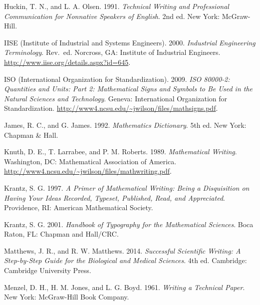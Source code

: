 \documentclass{wscpaperproc}
\theoremstyle{wsc}
\begin{document}
\begin{hangref}
\item
Huckin, T. N., and L. A. Olsen.  1991.  {\it Technical Writing and
Professional Communication for Nonnative Speakers of English}.  2nd ed. New
York: McGraw-Hill.


\item
IISE (Institute of Industrial and Systems Engineers).  2000. {\it
Industrial Engineering Terminology}.  Rev.\ ed.  Norcross, GA: Institute of
Industrial Engineers.
\href{http://www.iise.org/details.aspx?id=645}%
{\url{http://www.iise.org/details.aspx?id=645}}\textcolor{black}{.}


\item
ISO (International Organization for Standardization).  2009.  \textit{ISO
80000-2: Quantities and Units: Part 2: Mathematical Signs and Symbols to
Be Used in the Natural Sciences and Technology}.  Geneva: International
Organization for Standardization.
\href{http://www4.ncsu.edu/~jwilson/files/mathsigns.pdf}%
{\url{http://www4.ncsu.edu/~jwilson/files/mathsigns.pdf}}\textcolor{black}{.}

 
\item
James, R. C., and G. James.  1992.  {\it Mathematics Dictionary}. 5th ed.
New York: Chapman \& Hall.

\item
Knuth, D. E., T. Larrabee, and P. M. Roberts.  1989.  \textit{Mathematical
Writing}.  Washington, DC: Mathematical Association of America.  
\href{http://www4.ncsu.edu/~jwilson/files/mathwriting.pdf}%
{\url{http://www4.ncsu.edu/~jwilson/files/mathwriting.pdf}}\textcolor{black}{.}

\item
Krantz, S. G\@.  1997.  {\it A Primer of Mathematical Writing: Being a
Disquisition on Having Your Ideas Recorded, Typeset, Published, Read, and
Appreciated}.  Providence, RI: American Mathematical Society.

\item
Krantz, S. G\@.  2001.  \textit{Handbook of Typography for the
Mathematical Sciences}.  Boca Raton, FL: Chapman and Hall/CRC.

\item
Matthews, J. R., and R. W. Matthews.  2014.  {\it
Successful Scientific Writing: A Step-by-Step Guide for the Biological
and Medical Sciences}.  4th ed.  Cambridge: Cambridge University Press.


\item
Menzel, D. H., H. M. Jones, and L. G. Boyd.  1961.  {\em Writing
a Technical Paper}.  New York: McGraw-Hill Book Company.



\end{hangref}
\end{document}
